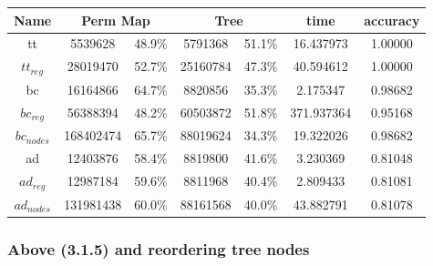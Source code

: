\documentclass[]{article}
\begin{document}
\begin{center}
\begin{tabular} { |c|c|c|c|c|c|c| }
\hline
Name & \multicolumn{2}{c|}{Perm Map} & \multicolumn{2}{c|}{Tree} & time & accuracy \\
\hline

tt & 5539628 & 48.9\%  & 5791368 & 51.1\% & 16.437973 & 1.00000 \\

$tt_{reg}$ & 28019470 & 52.7\% & 25160784 & 47.3\% & 40.594612 & 1.00000 \\

bc & 16164866 & 64.7\% & 8820856 & 35.3\% & 2.175347 & 0.98682 \\

$bc_{reg}$ & 56388394 & 48.2\% & 60503872 & 51.8\% & 371.937364 & 0.95168 \\

$bc_{nodes}$ & 168402474 & 65.7\% & 88019624 & 34.3\% & 19.322026 & 0.98682 \\

ad & 12403876 & 58.4\% & 8819800 & 41.6\% & 3.230369 & 0.81048 \\

$ad_{reg}$ &12987184 & 59.6\% & 8811968 & 40.4\% & 2.809433 & 0.81081 \\

$ad_{nodes}$ & 131981438 & 60.0\% & 88161568 & 40.0\% & 43.882791 & 0.81078 \\
\hline
\end{tabular}
\end{center}

\subsubsection{Above (3.1.5) and reordering tree nodes}
\end{document}

